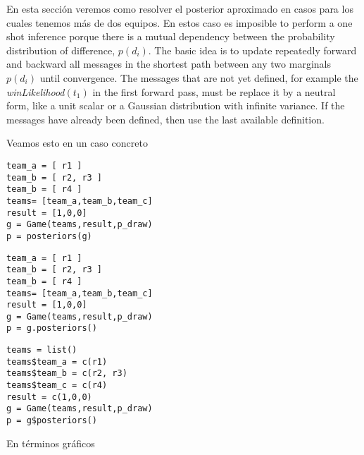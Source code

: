 \documentclass[article]{jss}
\begin{document}
En esta sección veremos como resolver el posterior aproximado en casos para los cuales tenemos más de dos equipos.
%
En estos caso es imposible to perform a one shot inference porque there is a mutual dependency between the probability distribution of difference, $p(d_i)$.
%
The basic idea is to update repeatedly forward and backward all messages in the shortest path between any two marginals $p(d_i)$ until convergence.
%
The messages that are not yet defined, for example the \emph{winLikelihood}$(t_1)$ in the first forward pass, must be replace it by a neutral form, like a unit scalar or a Gaussian distribution with infinite variance.
%
If the messages have already been defined, then use the last available definition.

Veamos esto en un caso concreto
%
\begin{paracol}{3}
\begin{lstlisting}[backgroundcolor=\color{julia}]
team_a = [ r1 ]
team_b = [ r2, r3 ]
team_b = [ r4 ]
teams= [team_a,team_b,team_c]
result = [1,0,0]
g = Game(teams,result,p_draw)
p = posteriors(g)
\end{lstlisting}
  \switchcolumn
\begin{lstlisting}[backgroundcolor=\color{python}]
team_a = [ r1 ]
team_b = [ r2, r3 ]
team_b = [ r4 ]
teams= [team_a,team_b,team_c]
result = [1,0,0]
g = Game(teams,result,p_draw)
p = g.posteriors()
\end{lstlisting}
   \switchcolumn
\begin{lstlisting}[backgroundcolor=\color{r}]
teams = list()
teams$team_a = c(r1)
teams$team_b = c(r2, r3)
teams$team_c = c(r4)
result = c(1,0,0)
g = Game(teams,result,p_draw)
p = g$posteriors()
\end{lstlisting}  
\end{paracol}
%
En términos gráficos 
\end{document}
